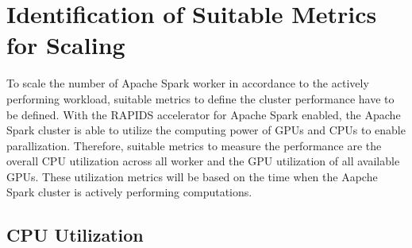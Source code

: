\section{Identification of Suitable Metrics for Scaling}
To scale the number of Apache Spark worker in accordance to the actively performing workload, suitable metrics to define the cluster performance have to be defined.
With the RAPIDS accelerator for Apache Spark enabled, the Apache Spark cluster is able to utilize the computing power of GPUs and CPUs to enable parallization.
Therefore, suitable metrics to measure the performance are the overall CPU utilization across all worker and the GPU utilization of all available GPUs.
These utilization metrics will be based on the time when the Aapche Spark cluster is actively performing computations.


\subsection{CPU Utilization}



